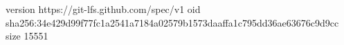 version https://git-lfs.github.com/spec/v1
oid sha256:34e429d99f77fc1a2541a7184a02579b1573daaffa1c795dd36ae63676c9d9cc
size 15551
